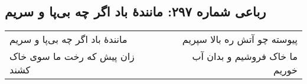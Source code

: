 \begin{center}
\section*{رباعی شماره ۲۹۷: مانندهٔ باد اگر چه بی‌پا و سریم}
\label{sec:sh297}
\begin{longtable}{l p{0.5cm} r}
مانندهٔ باد اگر چه بی‌پا و سریم
&&
پیوسته چو آتش ره بالا سپریم
\\
زان پیش که رخت ما سوی خاک کشند
&&
ما خاک فروشیم و بدان آب خوریم
\\
\end{longtable}
\end{center}
